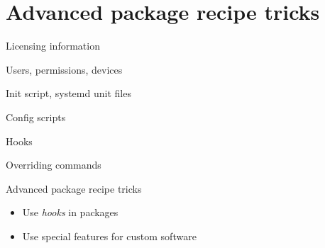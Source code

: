 \section{Advanced package recipe tricks}

\begin{frame}{Licensing information}


\end{frame}

\begin{frame}{Users, permissions, devices}


\end{frame}

\begin{frame}{Init script, systemd unit files}


\end{frame}

\begin{frame}{Config scripts}


\end{frame}

\begin{frame}{Hooks}

\end{frame}

\begin{frame}{Overriding commands}

\end{frame}

\setuplabframe
{Advanced package recipe tricks}
{
  \begin{itemize}
  \item Use {\em hooks} in packages
  \item Use special features for custom software
  \end{itemize}
}
